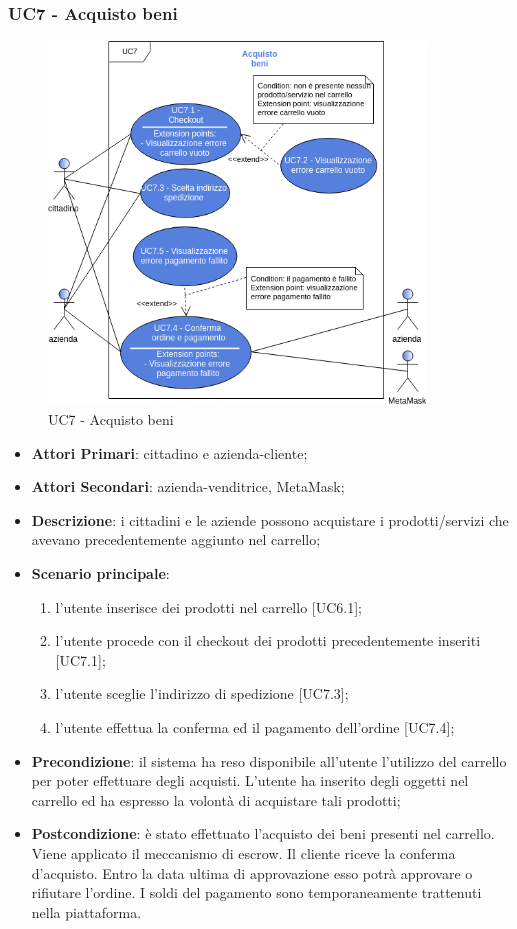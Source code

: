 \subsubsection{UC7 - Acquisto beni}
\begin{figure}[h]
	\includegraphics[width=10cm]{res/images/UC7-Generale.png}
	\centering
	\caption{UC7 - Acquisto beni}
\end{figure}
\begin{itemize}
	\item \textbf{Attori Primari}: cittadino e azienda-cliente;
	\item \textbf{Attori Secondari}: azienda-venditrice, MetaMask\glo;
	\item \textbf{Descrizione}: i cittadini e le aziende possono acquistare i prodotti/servizi che avevano precedentemente aggiunto nel carrello;
	\item \textbf{Scenario principale}: 
	\begin{enumerate}[label=\alph*.]
		\item l'utente inserisce dei prodotti nel carrello [UC6.1];
		\item l'utente procede con il checkout dei prodotti precedentemente inseriti [UC7.1];
		\item l'utente sceglie l'indirizzo di spedizione [UC7.3];
		\item l'utente effettua la conferma ed il pagamento dell'ordine [UC7.4];
	\end{enumerate}
	
	\item \textbf{Precondizione}: il sistema ha reso disponibile all'utente l'utilizzo del carrello per poter effettuare degli acquisti. L'utente ha inserito degli oggetti nel carrello ed ha espresso la volontà di acquistare tali prodotti;
	\item \textbf{Postcondizione}: è stato effettuato l'acquisto dei beni presenti nel carrello. Viene applicato il meccanismo di escrow\glo. Il cliente riceve la conferma d'acquisto\glo. Entro la data ultima di approvazione esso potrà approvare o rifiutare l'ordine. I soldi del pagamento sono temporaneamente trattenuti nella piattaforma.
\end{itemize} 
